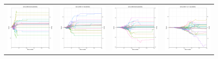 \begin{figure}
\begin{tabular}{cccc}
\hspace{-0.5cm}\includegraphics[width = 1.55in]{images/Visualizations/GAvsANN/4000ms5x5.png} &
\hspace{-0.5cm}\includegraphics[width = 1.55in]{images/Visualizations/GAvsANN/4000ms7x7.png} &
\hspace{-0.5cm}\includegraphics[width = 1.55in]{images/Visualizations/GAvsANN/4000ms9x9.png} &
\hspace{-0.5cm}\includegraphics[width = 1.55in]{images/Visualizations/GAvsANN/4000ms11x11.png} \\


\end{tabular}
\end{figure}
